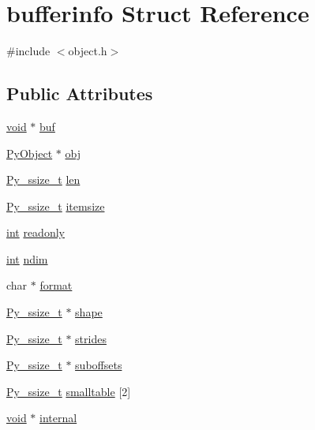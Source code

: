 \hypertarget{structbufferinfo}{}\section{bufferinfo Struct Reference}
\label{structbufferinfo}


{\ttfamily \#include $<$object.\+h$>$}

\subsection*{Public Attributes}
\begin{DoxyCompactItemize}
\item 
\mbox{\hyperlink{_s_d_l__opengles2__gl2ext_8h_ae5d8fa23ad07c48bb609509eae494c95}{void}} $\ast$ \mbox{\hyperlink{structbufferinfo_a24401e8dab59cb9889137532191e2695}{buf}}
\item 
\mbox{\hyperlink{_python27_2object_8h_aadc84ac7aed2cfa6f20c25f62bf3dac7}{Py\+Object}} $\ast$ \mbox{\hyperlink{structbufferinfo_a7517716353309d268e23660dc802c6ca}{obj}}
\item 
\mbox{\hyperlink{pyport_8h_ac6411a3dfda9ac6feb9e8d859b1184bc}{Py\+\_\+ssize\+\_\+t}} \mbox{\hyperlink{structbufferinfo_af68796aac75561d6da012f5f1615981e}{len}}
\item 
\mbox{\hyperlink{pyport_8h_ac6411a3dfda9ac6feb9e8d859b1184bc}{Py\+\_\+ssize\+\_\+t}} \mbox{\hyperlink{structbufferinfo_aa0de675754767fa69b18b75a579d9edc}{itemsize}}
\item 
\mbox{\hyperlink{warnings_8h_a74f207b5aa4ba51c3a2ad59b219a423b}{int}} \mbox{\hyperlink{structbufferinfo_ac642ba143cd5883184a5000fde3c0273}{readonly}}
\item 
\mbox{\hyperlink{warnings_8h_a74f207b5aa4ba51c3a2ad59b219a423b}{int}} \mbox{\hyperlink{structbufferinfo_a6286d6ec73743f70b1025554fba51724}{ndim}}
\item 
char $\ast$ \mbox{\hyperlink{structbufferinfo_a84de35655621dc0e8a439bb6241a1aaa}{format}}
\item 
\mbox{\hyperlink{pyport_8h_ac6411a3dfda9ac6feb9e8d859b1184bc}{Py\+\_\+ssize\+\_\+t}} $\ast$ \mbox{\hyperlink{structbufferinfo_a46c28153bfcc469481d0607733400d6d}{shape}}
\item 
\mbox{\hyperlink{pyport_8h_ac6411a3dfda9ac6feb9e8d859b1184bc}{Py\+\_\+ssize\+\_\+t}} $\ast$ \mbox{\hyperlink{structbufferinfo_a0fcbd0ae5672e27fac5c809ae8ed63df}{strides}}
\item 
\mbox{\hyperlink{pyport_8h_ac6411a3dfda9ac6feb9e8d859b1184bc}{Py\+\_\+ssize\+\_\+t}} $\ast$ \mbox{\hyperlink{structbufferinfo_a537cac447ea7c273dc1a7a847a954c21}{suboffsets}}
\item 
\mbox{\hyperlink{pyport_8h_ac6411a3dfda9ac6feb9e8d859b1184bc}{Py\+\_\+ssize\+\_\+t}} \mbox{\hyperlink{structbufferinfo_a6356204d7bfc7a21dd86da6f7ab6268c}{smalltable}} \mbox{[}2\mbox{]}
\item 
\mbox{\hyperlink{_s_d_l__opengles2__gl2ext_8h_ae5d8fa23ad07c48bb609509eae494c95}{void}} $\ast$ \mbox{\hyperlink{structbufferinfo_a1025fc652a0a920aa773ca3ffbd79778}{internal}}
\end{DoxyCompactItemize}


